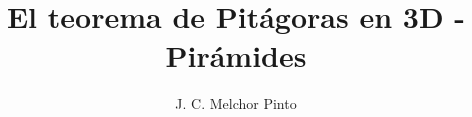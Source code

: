 \documentclass[12pt]{guia}
\title{El teorema de Pitágoras en 3D - Pirámides}
\author{J. C. Melchor Pinto}
\begin{document}
\pagestyle{headandfoot}
\addpoints
\INFO
\printanswers

\newpage
\begin{questions}
    
    
    
\end{questions}
\end{document}
